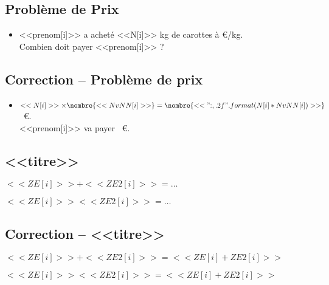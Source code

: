 \documentclass[a4paper,11pt,fleqn]{article}
\begin{document}
\pagestyle{empty}


\subsection*{Problème de Prix}
\begin{itemize}
\item <<prenom[i]>> a acheté <<N[i]>> kg de carottes à  €/kg.\\
Combien doit payer <<prenom[i]>> ?

\end{itemize}


\subsection*{Correction -- Problème de prix}
\begin{itemize}
	\item $<<N[i]>>\times\nombre{<<NvNN[i]>>}=\nombre{<<"{:,.2f}".format(N[i]*NvNN[i])>>}$~€.\\
<<prenom[i]>> va payer ~€.

\end{itemize}

\subsection*{<<titre>>}
\begin{description}

  \item $<<ZE[i]>>+<<ZE2[i]>>=\ldots$
  \item $<<ZE[i]>><<ZE2[i]>>=\ldots$	
\end{description}

\subsection*{Correction -- <<titre>>}
\begin{description}

  \item $<<ZE[i]>>+<<ZE2[i]>>=<<ZE[i]+ZE2[i]>>$
  \item $<<ZE[i]>><<ZE2[i]>>=<<ZE[i]+ZE2[i]>>$	
\end{description}
\end{document}
